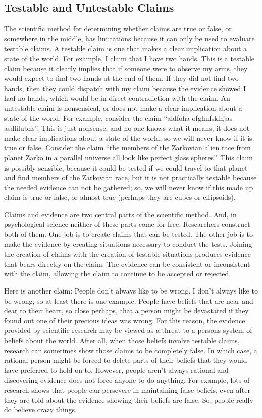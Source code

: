 \subsection{Testable and Untestable Claims}
The scientific method for determining whether claims are true or false, or somewhere in the middle, has limitations because it can only be used to evaluate testable claims. A testable claim is one that makes a clear implication about a state of the world. For example, I claim that I have two hands. This is a testable claim because it clearly implies that if someone were to observe my arms, they would expect to find two hands at the end of them. If they did not find two hands, then they could dispatch with my claim because the evidence showed I had no hands, which would be in direct contradiction with the claim. An untestable claim is nonsensical, or does not make a clear implication about a state of the world. For example, consider the claim “aldfoha ofghnfsklhjas asdfilubhs”. This is just nonsense, and no one knows what it means, it does not make clear implications about a state of the world, so we will never know if it is true or false. Consider the claim “the members of the Zarkovian alien race from planet Zarko in a parallel universe all look like perfect glass spheres”. This claim is possibly sensible, because it could be tested if we could travel to that planet and find members of the Zarkovian race, but it is not practically testable because the needed evidence can not be gathered; so, we will never know if this made up claim is true or false, or almost true (perhaps they are cubes or ellipsoids).

Claims and evidence are two central parts of the scientific method. And, in psychological science neither of these parts come for free. Researchers construct both of them. One job is to create claims that can be tested. The other job is to make the evidence by creating situations necessary to conduct the tests. Joining the creation of claims with the creation of testable situations produces evidence that bears directly on the claim. The evidence can be consistent or inconsistent with the claim, allowing the claim to continue to be accepted or rejected. 

Here is another claim: People don't always like to be wrong. I don't always like to be wrong, so at least there is one example. People have beliefs that are near and dear to their heart, so close perhaps, that a person might be devastated if they found out one of their precious ideas was wrong. For this reason, the evidence provided by scientific research may be viewed as a threat to a persons system of beliefs about the world. After all, when those beliefs involve testable claims, research can sometimes show those claims to be completely false. In which case, a rational person might be forced to delete parts of their beliefs that they would have preferred to hold on to. However, people aren't always rational and discovering evidence does not force anyone to do anything. For example, lots of research shows that people can persevere in maintaining false beliefs, even after they are told about the evidence showing their beliefs are false. So, people really do believe crazy things.

